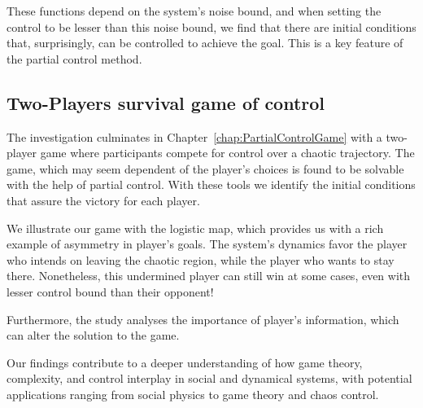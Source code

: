 These functions depend on the system's noise bound, and when setting the control to be lesser than this noise bound, we find that there are initial conditions that, surprisingly, can be controlled to achieve the goal. This is a key feature of the partial control method.

\subsection{Two-Players survival game of control}

The investigation culminates in Chapter~\ref{chap:PartialControlGame} with a two-player game where participants compete for control over a chaotic trajectory. The game, which may seem dependent of the player's choices is found to be solvable with the help of partial control. With these tools we identify the initial conditions that assure the victory for each player. 

We illustrate our game with the logistic map, which provides us with a rich example of asymmetry in player's goals. The system's dynamics favor the player who intends on leaving the chaotic region, while the player who wants to stay there. Nonetheless, this undermined player can still win at some cases, even with lesser control bound than their opponent!

Furthermore, the study analyses the importance of player's information, which can alter the solution to the game. 


Our findings contribute to a deeper understanding of how game theory, complexity, and control interplay in social and dynamical systems, with potential applications ranging from social physics to game theory and chaos control.











